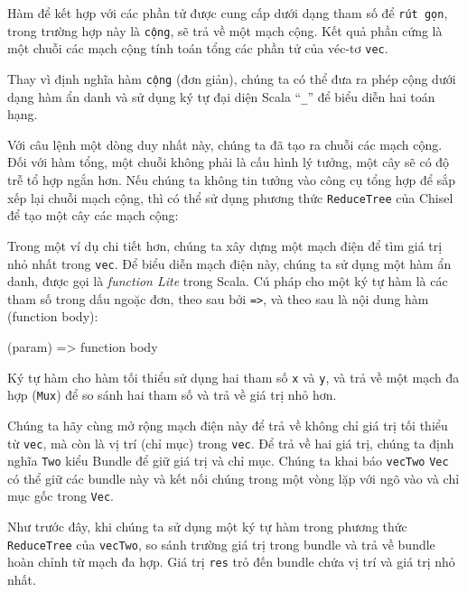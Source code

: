 \documentclass[%
    10pt,
    headinclude, footexclude,
    openright, %
    notitlepage,
    cleardoubleempty,
    headsepline,
    pointlessnumbers,
    bibtotoc, idxtotoc,
    ]{scrbook}
\newcommand{\code}[1]{{\small{\texttt{#1}}}}
\begin{document}
Hàm để kết hợp với các phần tử được cung cấp dưới dạng tham số để \code {rút gọn}, trong trường hợp này là \code{cộng}, sẽ trả về một mạch cộng. Kết quả phần cứng là một chuỗi các mạch cộng tính toán tổng các phần tử của véc-tơ \code{vec}.

Thay vì định nghĩa hàm \code{cộng} (đơn giản), chúng ta có thể đưa ra phép cộng dưới dạng hàm ẩn danh và sử dụng ký tự đại diện Scala ``\code{\_}'' để biểu diễn hai toán hạng. 


\noindent Với câu lệnh một dòng duy nhất này, chúng ta đã tạo ra chuỗi các mạch cộng. Đối với hàm tổng, một chuỗi không phải là cấu hình lý tưởng, một cây sẽ có độ trễ tổ hợp ngắn hơn. Nếu chúng ta không tin tưởng vào công cụ tổng hợp để sắp xếp lại chuỗi mạch cộng, thì có thể sử dụng phương thức \code{ReduceTree} của Chisel để tạo một cây các mạch cộng: 


Trong một ví dụ chi tiết hơn, chúng ta xây dựng một mạch điện để tìm giá trị nhỏ nhất trong \code{vec}. Để biểu diễn mạch điện này, chúng ta sử dụng một hàm ẩn danh, được gọi là \emph{function Lite} trong Scala. Cú pháp cho một ký tự hàm là các tham số trong dấu ngoặc đơn, theo sau bởi \code{=>}, và theo sau là nội dung hàm (function body): 

\begin{chisel}
  (param) => function body
\end{chisel}

\noindent Ký tự hàm cho hàm tối thiểu sử dụng hai tham số \code{x} và \code{y}, và trả về một mạch đa hợp (\code{Mux}) để so sánh hai tham số và trả về giá trị nhỏ hơn. 


Chúng ta hãy cùng mở rộng mạch điện này để trả về không chỉ giá trị tối thiểu từ \code{vec}, mà còn là vị trí (chỉ mục) trong \code{vec}. Để trả về hai giá trị, chúng ta định nghĩa \code{Two} kiểu Bundle để giữ giá trị và chỉ mục. Chúng ta khai báo \code{vecTwo} \code {Vec} có thể giữ các bundle này và kết nối chúng trong một vòng lặp với ngõ vào và chỉ mục gốc trong \code{Vec}.

Như trước đây, khi chúng ta sử dụng một ký tự hàm trong phương thức \code{ReduceTree} của \code{vecTwo}, so sánh trường giá trị trong bundle và trả về bundle hoàn chỉnh từ mạch đa hợp. Giá trị \code{res} trỏ đến bundle chứa vị trí và giá trị nhỏ nhất. 
\end{document}
